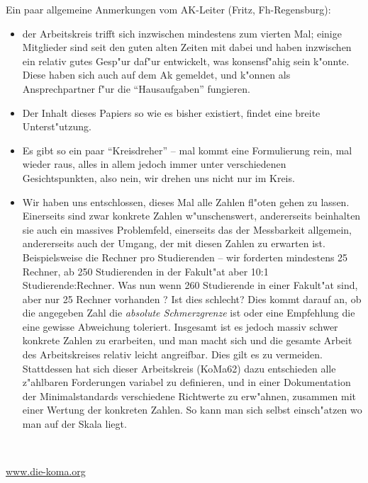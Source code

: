\documentclass[10pt,twoside,a5paper,openright]{book}
\newenvironment{komacmt62}{%
\marginpar{\framebox{62}} %
\begin{center}\begin{minipage}{.8\textwidth}\normalfont \mdseries \sffamily \small \color{grau} }{\end{minipage}\end{center} %
}
\begin{document}




\newpage
\tableofcontents\thispagestyle{fancy}


\setlength{\parskip}{1.5ex}

\begin{kcmt62}
\begin{komacmt62}
Ein paar allgemeine Anmerkungen vom AK-Leiter (Fritz, Fh-Regensburg):
\begin{itemize}
\item der Arbeitskreis trifft sich inzwischen mindestens zum vierten Mal; einige
 Mitglieder sind seit den guten alten Zeiten mit dabei und haben inzwischen ein
 relativ gutes Gesp"ur daf"ur entwickelt, was konsensf"ahig sein k"onnte. Diese
 haben sich auch auf dem Ak gemeldet, und k"onnen als Ansprechpartner f"ur die
 "`Hausaufgaben"' fungieren.
\item Der Inhalt dieses Papiers so wie es bisher existiert, findet eine breite
 Unterst"utzung.
\item Es gibt so ein paar "`Kreisdreher"' -- mal kommt eine Formulierung rein, mal
 wieder raus, alles in allem jedoch immer unter verschiedenen Gesichtspunkten,
 also nein, wir drehen uns nicht nur im Kreis.
\item Wir haben uns entschlossen, dieses Mal alle Zahlen fl"oten gehen zu lassen.
 Einerseits sind zwar konkrete Zahlen w"unschenswert, andererseits beinhalten sie
 auch ein massives Problemfeld, einerseits das der Messbarkeit allgemein, andererseits
 auch der Umgang, der mit diesen Zahlen zu erwarten ist. Beispielsweise die Rechner
 pro Studierenden -- wir forderten mindestens 25 Rechner, ab 250 Studierenden in
 der Fakult"at aber 10:1 Studierende:Rechner. Was nun wenn 260 Studierende in einer
 Fakult"at sind, aber nur 25 Rechner vorhanden ? Ist dies schlecht? Dies kommt darauf
 an, ob die angegeben Zahl die \emph{absolute Schmerzgrenze} ist oder eine Empfehlung
 die eine gewisse Abweichung toleriert. Insgesamt ist es jedoch massiv schwer konkrete
 Zahlen zu erarbeiten, und man macht sich und die gesamte Arbeit des Arbeitskreises
 relativ leicht angreifbar. Dies gilt es zu vermeiden. Stattdessen hat sich dieser
 Arbeitskreis (KoMa62) dazu entschieden alle z"ahlbaren Forderungen variabel zu
 definieren, und in einer Dokumentation der Minimalstandards verschiedene Richtwerte
 zu erw"ahnen, zusammen mit einer Wertung der konkreten Zahlen. So kann man sich
 selbst einsch"atzen wo man auf der Skala liegt.
\end{itemize}
\end{komacmt62}
\end{kcmt62}

\mainmatter

\newpage





~
\newpage
\thispagestyle{empty}
~\newpage
\thispagestyle{empty}~
\vfill
\begin{center}
\url{www.die-koma.org}
\end{center}
\end{document}
